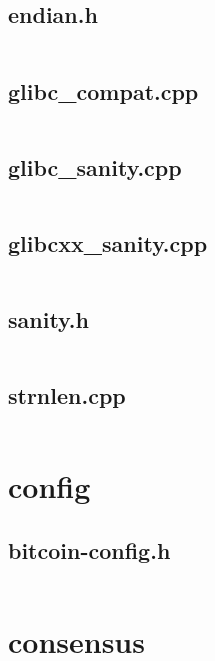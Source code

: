 \documentclass{article}
\begin{document}
\subsection{endian.h}
\inputminted{cpp}{/home/dufferzafar/dev/@clones/bitcoin/src/compat/endian.h}
\newpage

\subsection{glibc\_compat.cpp}
\inputminted{cpp}{/home/dufferzafar/dev/@clones/bitcoin/src/compat/glibc_compat.cpp}
\newpage

\subsection{glibc\_sanity.cpp}
\inputminted{cpp}{/home/dufferzafar/dev/@clones/bitcoin/src/compat/glibc_sanity.cpp}
\newpage

\subsection{glibcxx\_sanity.cpp}
\inputminted{cpp}{/home/dufferzafar/dev/@clones/bitcoin/src/compat/glibcxx_sanity.cpp}
\newpage

\subsection{sanity.h}
\inputminted{cpp}{/home/dufferzafar/dev/@clones/bitcoin/src/compat/sanity.h}
\newpage

\subsection{strnlen.cpp}
\inputminted{cpp}{/home/dufferzafar/dev/@clones/bitcoin/src/compat/strnlen.cpp}
\newpage

\section{config}

\subsection{bitcoin-config.h}
\inputminted{cpp}{/home/dufferzafar/dev/@clones/bitcoin/src/config/bitcoin-config.h}
\newpage

\section{consensus}
\end{document}
